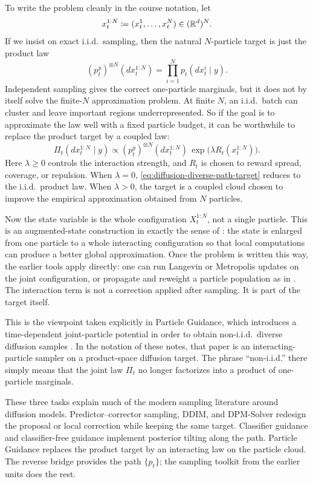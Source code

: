 To write the problem cleanly in the course notation, let
\[
  x_t^{1:N}\coloneqq (x_t^1,\dots,x_t^N)\in(\mathbb{R}^d)^N.
\]
If we insist on exact i.i.d.\ sampling, then the natural \(N\)-particle target is just the product law
\[
  (p_t^y)^{\otimes N}(dx_t^{1:N})
  =
  \prod_{i=1}^N p_t(dx_t^i\mid y).
\]
Independent sampling gives the correct one-particle marginals, but it does not by itself solve the finite-\(N\) approximation problem.
At finite \(N\), an i.i.d.\ batch can cluster and leave important regions underrepresented.
So if the goal is to approximate the law well with a fixed particle budget, it can be worthwhile to replace the product target by a coupled law:
\begin{equation}
  \Pi_t(dx_t^{1:N}\mid y)
  \propto
  (p_t^y)^{\otimes N}(dx_t^{1:N})\,
  \exp\!\bigl(\lambda R_t(x_t^{1:N})\bigr).
  \label{eq:diffusion-diverse-path-target}
\end{equation}
Here \(\lambda\ge 0\) controls the interaction strength, and \(R_t\) is chosen to reward spread, coverage, or repulsion.
When \(\lambda=0\), \eqref{eq:diffusion-diverse-path-target} reduces to the i.i.d.\ product law.
When \(\lambda>0\), the target is a coupled cloud chosen to improve the empirical approximation obtained from \(N\) particles.

Now the state variable is the whole configuration \(X_t^{1:N}\), not a single particle.
This is an augmented-state construction in exactly the sense of :
the state is enlarged from one particle to a whole interacting configuration so that local computations can produce a better global approximation.
Once the problem is written this way, the earlier tools apply directly:
one can run Langevin or Metropolis updates on the joint configuration, or propagate and reweight a particle population as in .
The interaction term is not a correction applied after sampling.
It is part of the target itself.

This is the viewpoint taken explicitly in Particle Guidance, which introduces a time-dependent joint-particle potential in order to obtain non-i.i.d.\ diverse diffusion samples \citep[\S3]{corso_xu_de_bortoli_barzilay_jaakkola_2023_particle_guidance}.
In the notation of these notes, that paper is an interacting-particle sampler on a product-space diffusion target.
The phrase ``non-i.i.d.'' there simply means that the joint law \(\Pi_t\) no longer factorizes into a product of one-particle marginals.

These three tasks explain much of the modern sampling literature around diffusion models.
Predictor--corrector sampling, DDIM, and DPM-Solver redesign the proposal or local correction while keeping the same target.
Classifier guidance and classifier-free guidance implement posterior tilting along the path.
Particle Guidance replaces the product target by an interacting law on the particle cloud.
The reverse bridge provides the path \(\{p_t\}\); the sampling toolkit from the earlier units does the rest.
